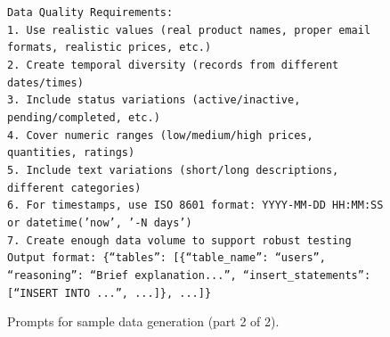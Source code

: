 \begin{figure}[p]
{\begin{minipage}{0.97\textwidth}
        \texttt{Data Quality Requirements:}\\
        \texttt{1. Use realistic values (real product names, proper email formats, realistic prices, etc.)}\\
        \texttt{2. Create temporal diversity (records from different dates/times)}\\
        \texttt{3. Include status variations (active/inactive, pending/completed, etc.)}\\
        \texttt{4. Cover numeric ranges (low/medium/high prices, quantities, ratings)}\\
        \texttt{5. Include text variations (short/long descriptions, different categories)}\\
        \texttt{6. For timestamps, use ISO 8601 format: YYYY-MM-DD HH:MM:SS or datetime('now', '-N days')}\\
        \texttt{7. Create enough data volume to support robust testing}\\[4pt]

        \texttt{Output format: \{``tables'': [\{``table\_name'': ``users'', ``reasoning'': ``Brief explanation...'', ``insert\_statements'': [``INSERT INTO ...'', ...]\}, ...]\}}

        \vspace{1pt}
        \end{minipage}
    }
    \captionsetup{labelformat=default, name=Figure}
    \caption{Prompts for sample data generation (part 2 of 2).}
    \label{fig:gen-data-2}
\end{figure}
